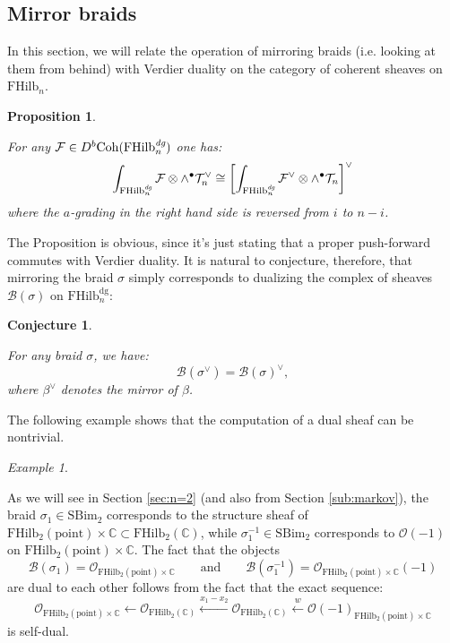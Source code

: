 \documentclass[12pt]{amsart}
\numberwithin{equation}{section}
\newtheorem{proposition}[theorem]{Proposition}
\newtheorem{conjecture}[theorem]{Conjecture}
\theoremstyle{definition}
\theoremstyle{remark}
\newtheorem{example}[theorem]{Example}
\newcommand{\CC}{\mathbb{C}}
\newcommand{\CB}{\mathcal{B}}
\newcommand{\CO}{\mathcal{O}}
\newcommand{\CF}{\mathcal{F}}
\newcommand{\CT}{\mathcal{T}}
\renewcommand{\1}{\mathbf{1}}
\newcommand{\coh}{\mathrm{Coh}}
\newcommand{\FH}{\mathrm{FHilb}}
\newcommand{\point}{\mathrm{point}}
\newcommand{\SBim}{\mathrm{SBim}}
\newcommand{\dg}{\text{dg}}%
\newcommand{\edg}{\emph{dg}}
\begin{document}
\subsection{Mirror braids}
\label{sub:mirror}

In this section, we will relate the operation of mirroring braids (i.e. looking at them from behind) with Verdier duality on the category of coherent sheaves on $\FH_n$.

\begin{proposition}
\label{prop:mirror} 

For any  $\CF\in D^b\coh(\FH^\edg_n)$ one has:
$$
\int_{\FH_n^\edg} \CF \otimes \wedge^\bullet \CT_n^\vee \cong \left[\int_{\FH_n^\edg}\CF^{\vee} \otimes \wedge^\bullet \CT_n \right]^{\vee}
$$
where the $a$-grading in the right hand side is reversed from $i$ to $n-i$.
\end{proposition}

The Proposition is obvious, since it's just stating that a proper push-forward commutes with Verdier duality. It is natural to conjecture, therefore, that mirroring the braid $\sigma$ simply corresponds to dualizing the complex of sheaves $\CB(\sigma)$ on $\FH_n^\dg$:

\begin{conjecture}
\label{eqn:mirror}

For any braid $\sigma$, we have:
$$
\CB(\sigma^{\vee})=\CB(\sigma)^{\vee},
$$
where $\beta^{\vee}$ denotes the mirror of $\beta$.
\end{conjecture}

The following example shows that the computation of a dual sheaf can be nontrivial.

\begin{example}
\label{ex:mirror}

As we will see in Section \ref{sec:n=2} (and also from Section \ref{sub:markov}), the braid $\sigma_1\in \SBim_2$ corresponds to the structure sheaf of $\FH_2(\point)\times \CC\subset \FH_2(\CC)$, while $\sigma_1^{-1}\in \SBim_2$ corresponds to $\CO(-1)$ on  $\FH_2(\point)\times \CC$. The fact that the objects
$$
\CB(\sigma_1) = \CO_{\FH_2(\point)\times \CC} \qquad \text{and} \qquad \CB(\sigma^{-1}_1) = \CO_{\FH_2(\point)\times \CC}(-1)
$$
are dual to each other follows from the fact that the exact sequence:
$$
\CO_{\FH_2(\point)\times \CC}\xleftarrow{} \CO_{\FH_2(\CC)}\xleftarrow{x_1-x_2}\CO_{\FH_2(\CC)}\xleftarrow{w} \CO(-1)_{\FH_2(\point)\times \CC}
$$
is self-dual. 
\end{example}
\end{document}
